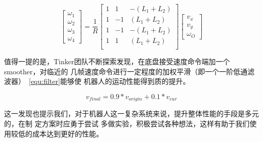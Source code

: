 \begin{equation}
  \label{equ:fin_all}
  \begin{bmatrix}
    \omega_1 \\
    \omega_2 \\
    \omega_3 \\
    \omega_4
  \end{bmatrix}
    = \frac{1}{R}
  \begin{bmatrix}
    1 &  1 & -(L_1 + L_2) \\
    1 & -1 &  (L_1 + L_2) \\
    1 & -1 & -(L_1 + L_2) \\
    1 &  1 &  (L_1 + L_2) \\
  \end{bmatrix}
  \begin{bmatrix}
    v_x \\
    v_y \\
    \omega_O
  \end{bmatrix}
\end{equation}

值得一提的是，Tinker团队不断探索发现，在底盘接受速度命令端加一个smoother，对临近的
几帧速度命令进行一定程度的加权平滑（即一个一阶低通滤波器）~\ref{equ:filter}能够使
机器人的运动性能得到质的提升。

\begin{equation}
  \label{equ:filter}
  v_{final} = 0.9 * v_{origin} + 0.1 * v_{cur}
\end{equation}

这一发现也提示我们，对于机器人这一复杂系统来说，提升整体性能的手段是多元的，在制
定方案时应勇于尝试
多做实验，积极尝试各种想法，这样有助于我们使用较低的成本达到更好的性能。

